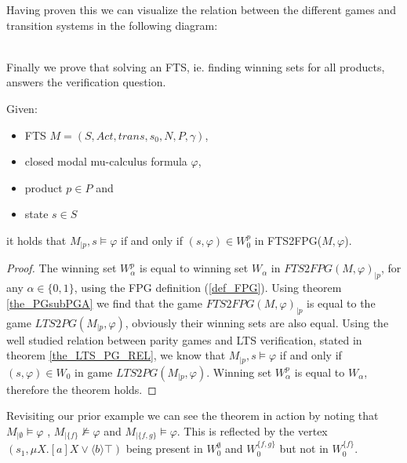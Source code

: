Having proven this we can visualize the relation between the different games and transition systems in the following diagram:
\\\\
Finally we prove that solving an FTS, ie. finding winning sets for all products, answers the verification question.
\begin{theorem}
	\label{the_FPG_ver_FTS}
	Given:
	\begin{itemize}
		\item FTS $M = (S, Act, trans, s_0, N, P, \gamma)$,
		\item closed modal mu-calculus formula $\varphi$,
		\item product $p \in P$ and
		\item state $s \in S$
	\end{itemize}
	it holds that $M_{|p}, s \models \varphi$ if and only if $(s, \varphi) \in W_0^p$ in FTS2FPG($M, \varphi$).
	\begin{proof}
		The winning set $W_\alpha^p$ is equal to winning set $W_\alpha$ in $FTS2FPG(M, \varphi)_{|p}$, for any $\alpha \in \{0,1\}$, using the FPG definition (\ref{def_FPG}). Using theorem \ref{the_PGsubPGA} we find that the game $FTS2FPG(M, \varphi)_{|p}$ is equal to the game $LTS2PG(M_{|p}, \varphi)$, obviously their winning sets are also equal. Using the well studied relation between parity games and LTS verification, stated in theorem \ref{the_LTS_PG_REL}, we know that $M_{|p}, s \models \varphi$ if and only if $(s, \varphi) \in W_0$ in game $LTS2PG(M_{|p},\varphi)$. Winning set $W_\alpha^p$ is equal to $W_\alpha$, therefore the theorem holds.
	\end{proof}
\end{theorem}

Revisiting our prior example we can see the theorem in action by noting that $M_{|\emptyset} \models \varphi$ , $M_{|\{f\}} \not\models \varphi$ and $M_{|\{f,g\}} \models \varphi$. This is reflected by the vertex $(s_1, \mu X. [a]X \vee \langle b \rangle \top)$ being present in $W_0^\emptyset$ and $W_0^{\{f,g\}}$ but not in $W_0^{\{f\}}$.